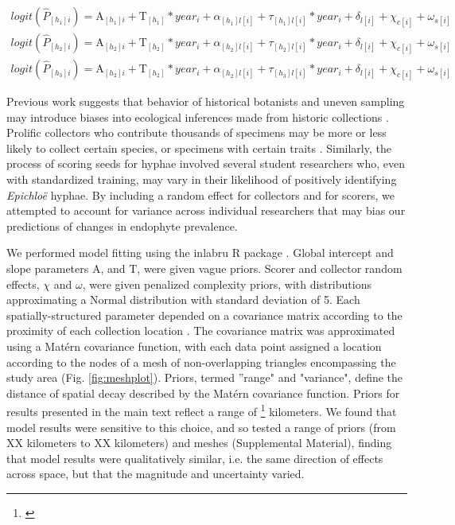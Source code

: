 \documentclass[11pt]{article}
\let\cite\citep
\newcommand{\tom}[2]{{\color{red}{#1}}\footnote{\textit{\color{red}{#2}}}}
\newcommand{\josh}[2]{{\color{orange}{#1}}\footnote{\textit{\color{orange}{#2}}}}
\begin{document}
\begin{subequations}
	\label{eq:trends}
	\begin{align}
		logit(\hat{P}_{[h_{1}]i}) =  \mathrm{A}_{[h_{1}]i} + \mathrm{T}_{[h_{1}]}*year_i  + \alpha_{[h_{1}]l[i]} + \tau_{[h_{1}]l[i]}*year_i  + \delta_{l[i]}+ \chi_{c[i]} + \omega_{s[i]} \\
		logit(\hat{P}_{[h_{2}]i}) = \mathrm{A}_{[h_{2}]i} + \mathrm{T}_{[h_{2}]}*year_i  + \alpha_{[h_{2}]l[i]} + \tau_{[h_{2}]l[i]}*year_i  + \delta_{l[i]}+ \chi_{c[i]} + \omega_{s[i]} \\
		logit(\hat{P}_{[h_{3}]i}) = \mathrm{A}_{[h_{2}]i} + \mathrm{T}_{[h_{2}]}*year_i  + \alpha_{[h_{2}]l[i]} + \tau_{[h_{3}]l[i]}*year_i  + \delta_{l[i]}+ \chi_{c[i]} + \omega_{s[i]}
	\end{align}
\end{subequations}


Previous work suggests that behavior of historical botanists and uneven sampling may introduce biases into ecological inferences made from historic collections \cite{kozlov2020biases}. 
Prolific collectors who contribute thousands of specimens may be more or less likely to collect certain species, or specimens with certain traits \cite{daru2018widespread}. 
Similarly, the process of scoring seeds for hyphae involved several student researchers who, even with standardized training, may vary in their likelihood of positively identifying \emph{Epichloë} hyphae. 
By including a random effect for collectors and for scorers, we attempted to account for variance across individual researchers that may bias our predictions of changes in endophyte prevalence.


We performed model fitting using the inlabru R package \citep{}.
Global intercept and slope parameters $\mathrm{A}$, and $\mathrm{T}$, were given vague priors.
Scorer and collector random effects, $\chi$ and $\omega$, were given penalized complexity priors, with distributions approximating a Normal distribution with standard deviation of 5. 
Each spatially-structured parameter depended on a covariance matrix according to the proximity of each collection location \citep{lindgren2011explicit,bakka2018spatial}. 
The covariance matrix was approximated using a Mat\'{e}rn covariance function, with each data point assigned a location according to the nodes of a mesh of non-overlapping triangles encompassing the study area (Fig. \ref{fig:meshplot}).
Priors, termed ''range" and "variance", define the distance of spatial decay described by the Mat\'{e}rn covariance function.
Priors for results presented in the main text reflect a range of \josh{XX}{} kilometers. 
We found that model results were sensitive to this choice, and so tested a range of priors (from XX kilometers to XX kilometers) and meshes (Supplemental Material), finding that model results were qualitatively similar, i.e. the same direction of effects across space, but that the magnitude and uncertainty varied. 
\end{document}
